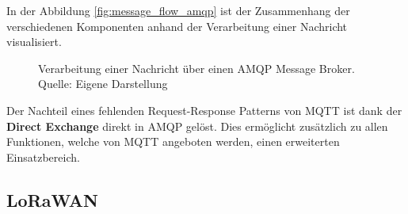 In der Abbildung \vref{fig:message_flow_amqp} ist der Zusammenhang der verschiedenen Komponenten anhand der Verarbeitung einer Nachricht visualisiert.

\begin{figure}
    \centering
    \caption{Verarbeitung einer Nachricht über einen \ac{AMQP} Message Broker.\\Quelle: Eigene Darstellung}
    \label{fig:message_flow_amqp}
\end{figure}

Der Nachteil eines fehlenden Request-Response Patterns von \ac{MQTT} ist dank der \textbf{Direct Exchange} direkt in \ac{AMQP} gelöst. Dies ermöglicht zusätzlich zu allen Funktionen, welche von \ac{MQTT} angeboten werden, einen erweiterten Einsatzbereich.

\pagebreak
\subsection{LoRaWAN}



